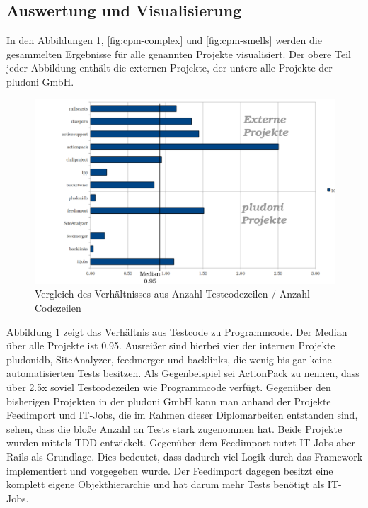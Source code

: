 \subsection{Auswertung und Visualisierung}
\label{sec:auswertungFinal}
In den Abbildungen \ref{fig:cpm-loclot}, \ref{fig:cpm-complex} und \ref{fig:cpm-smells} werden die gesammelten Ergebnisse für alle genannten Projekte visualisiert. Der obere Teil jeder Abbildung enthält die externen Projekte, der untere alle Projekte der pludoni GmbH.
\begin{figure}[htbp]
 \centering
 \includegraphics[width=\linewidth]{./diagrams/cpm-lotloc.pdf}
 \caption{Vergleich des Verhältnisses aus Anzahl Testcodezeilen / Anzahl Codezeilen}
 \label{fig:cpm-loclot}
\end{figure}

Abbildung \ref{fig:cpm-loclot} zeigt das Verhältnis aus Testcode zu Programmcode. Der Median über alle Projekte ist 0.95. Ausreißer sind hierbei vier der internen Projekte pludonidb, SiteAnalyzer, feedmerger und backlinks, die wenig bis gar keine automatisierten  Tests besitzen. Als Gegenbeispiel sei ActionPack zu nennen, dass über 2.5x soviel Testcodezeilen wie Programmcode verfügt. Gegenüber den bisherigen Projekten in der pludoni GmbH kann man anhand der Projekte Feedimport und IT-Jobs, die im Rahmen dieser Diplomarbeiten entstanden sind, sehen, dass die bloße Anzahl an Tests stark zugenommen hat. Beide Projekte wurden mittels TDD entwickelt. Gegenüber dem Feedimport nutzt IT-Jobs aber Rails als Grundlage. Dies bedeutet, dass dadurch viel Logik durch das Framework implementiert und vorgegeben wurde. Der Feedimport dagegen besitzt eine komplett eigene Objekthierarchie und hat darum mehr Tests benötigt als IT-Jobs.

